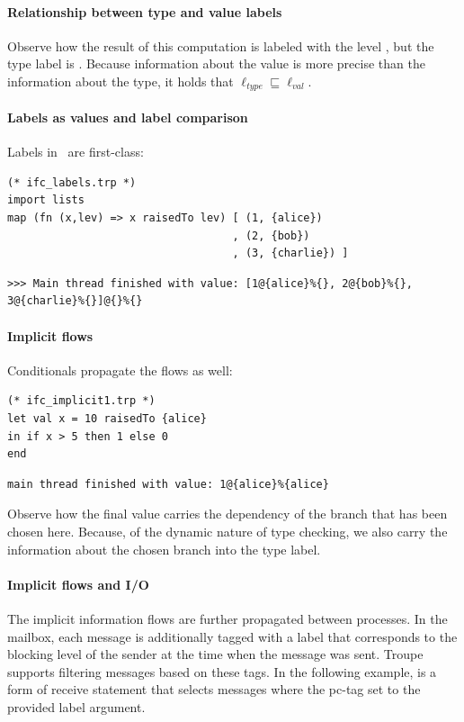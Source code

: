 \paragraph{Relationship between type and value labels}
Observe how the result of this computation is labeled with 
the level , but the type label is \lev{}.
Because information about the value is more precise than the information about the type, it holds that 
$\ell_{\mathit{type}} \sqsubseteq \ell_{\mathit{val}}$. 



\paragraph{Labels as values and label comparison}
Labels in \troupelang\ are first-class:

\begin{lstlisting}
(* ifc_labels.trp *)
import lists
map (fn (x,lev) => x raisedTo lev) [ (1, {alice})
                                   , (2, {bob})
                                   , (3, {charlie}) ]
\end{lstlisting}
\begin{lstlisting}
>>> Main thread finished with value: [1@{alice}%{}, 2@{bob}%{}, 
3@{charlie}%{}]@{}%{}    
\end{lstlisting}
\paragraph{Implicit flows}
Conditionals propagate the flows as well:


\begin{lstlisting}
(* ifc_implicit1.trp *)
let val x = 10 raisedTo {alice} 
in if x > 5 then 1 else 0 
end	
\end{lstlisting}
\begin{verbatim}
main thread finished with value: 1@{alice}%{alice}	
\end{verbatim}
Observe how the final value carries the dependency of the 
branch that has been chosen here. Because, of the dynamic nature of type checking,
we also carry the information about the chosen branch into the type label.




\paragraph{Implicit flows and I/O}
The implicit information flows are further propagated between processes. 
In the mailbox, each message is additionally tagged with a label that 
corresponds to the blocking level of the sender at the time when the message was sent.
Troupe supports filtering messages based on these tags.
In the following example,  is a form of receive statement that selects messages
where the pc-tag set to the provided label argument.

